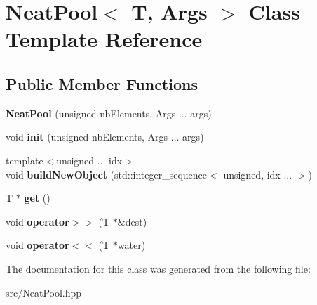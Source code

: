 \hypertarget{class_neat_pool}{}\section{Neat\+Pool$<$ T, Args $>$ Class Template Reference}
\label{class_neat_pool}
\subsection*{Public Member Functions}
\begin{DoxyCompactItemize}
\item 
\mbox{\label{class_neat_pool_a3f05eb4f5c7dcdbc6cc30e63374ca925}} 
{\bfseries Neat\+Pool} (unsigned nb\+Elements, Args ... args)
\item 
\mbox{\label{class_neat_pool_abaae97ca76236acdd3c2cc4f77da2f62}} 
void {\bfseries init} (unsigned nb\+Elements, Args ... args)
\item 
\mbox{\label{class_neat_pool_ac787d58e31027eee894a87ad2935a822}} 
{\footnotesize template$<$unsigned ... idx$>$ }\\void {\bfseries build\+New\+Object} (std\+::integer\+\_\+sequence$<$ unsigned, idx ... $>$)
\item 
\mbox{\label{class_neat_pool_a0cc52b8bf46f777543c536ffb321755e}} 
T $\ast$ {\bfseries get} ()
\item 
\mbox{\label{class_neat_pool_aa649761480b7c3e605a1c5eba6a2423c}} 
void {\bfseries operator$>$$>$} (T $\ast$\&dest)
\item 
\mbox{\label{class_neat_pool_a517c154eaa25f73f33265622ee4a90af}} 
void {\bfseries operator$<$$<$} (T $\ast$water)
\end{DoxyCompactItemize}


The documentation for this class was generated from the following file\+:\begin{DoxyCompactItemize}
\item 
src/Neat\+Pool.\+hpp\end{DoxyCompactItemize}
